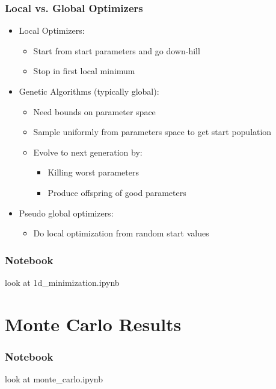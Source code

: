 \documentclass[11pt]{beamer}
\begin{document}
\begin{frame}[c]\frametitle{Local vs. Global Optimizers}
    \begin{itemize}
        \item Local Optimizers:
        \begin{itemize}
            \item Start from start parameters and go down-hill
            \item Stop in first local minimum
        \end{itemize}
        \item Genetic Algorithms (typically global):
        \begin{itemize}
            \item Need bounds on parameter space
            \item Sample uniformly from parameters space to get start population
            \item Evolve to next generation by:
            \begin{itemize}
                 \item Killing worst parameters
                 \item Produce offspring of good parameters
            \end{itemize}
        \end{itemize}
        \item Pseudo global optimizers:
        \begin{itemize}
            \item Do local optimization from random start values
        \end{itemize}
    \end{itemize}
\end{frame}



\begin{frame}[c]\frametitle{Notebook}
    look at 1d\_minimization.ipynb
\end{frame}


\section{Monte Carlo Results}


\begin{frame}[c]\frametitle{Notebook}

look at monte\_carlo.ipynb

\end{frame}
\end{document}
